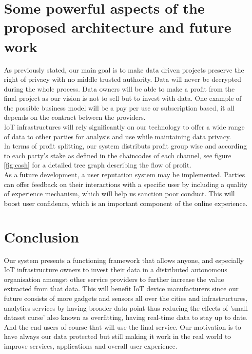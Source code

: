 \documentclass[conference]{IEEEtran}
\begin{document}
\section{Some powerful aspects of the proposed architecture and  future work}\label{TrstRef}
As previously stated, our main goal is to make data driven projects preserve the right of privacy with no middle trusted authority. Data will never be decrypted during the whole process. Data owners will be able to make a profit from the final project as our vision is not to sell but to invest with data. One example of the possible business model will be a pay per use or subscription based, it all depends on the contract between the providers.\\
IoT infrastructures will rely significantly on our technology to offer a wide range of data to other parties for analysis and use while maintaining data privacy.\\
In terms of profit splitting, our system distributs profit group wise and according to each party's stake as defined in the chaincodes of each channel, see figure \ref{fig:cash} for a detailed tree graph describing the flow of profit.\\
As a future development, a user reputation system may be implemented. Parties can offer feedback on their interactions with a specific user by including a quality of experience mechanism, which will help us sanction poor conduct. This will boost user confidence, which is an important component of the online experience.



\section*{Conclusion}
Our system presents a functioning framework that allows anyone, and especially IoT infrastructure owners to invest their data in a distributed autonomous organisation amongst other service providers to further increase the value extracted from that data. This will benefit IoT device manufacturers since our future consists of more gadgets and sensors all over the cities and infrastructures, analytics services by having broader data point thus reducing the effects of 'small dataset curse' also known as overfitting, having real-time data to stay up to date. And the end users of course that will use the final service.
Our motivation is to have always our data protected but still making it work in the real world to improve services, applications and overall user experience.



\end{document}
